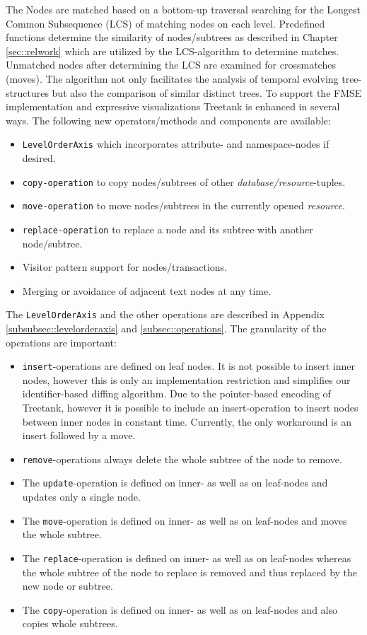 The Nodes are matched based on a bottom-up traversal searching for the Longest Common Subsequence (LCS) of matching nodes on each level. Predefined functions determine the similarity of nodes/subtrees as described in Chapter \ref{sec::relwork} which are utilized by the LCS-algorithm to determine matches. Unmatched nodes after determining the LCS are examined for crossmatches (moves). The algorithm not only facilitates the analysis of temporal evolving tree-structures but also the comparison of similar distinct trees. To support the FMSE implementation and expressive visualizations Treetank is enhanced in several ways. The following new operators/methods and components are available:

\begin{itemize}
\item \texttt{LevelOrderAxis} which incorporates attribute- and namespace-nodes if desired.
\item \texttt{copy-operation} to copy nodes/subtrees of other \emph{database/resource}-tuples.
\item \texttt{move-operation} to move nodes/subtrees in the currently opened \emph{resource}.
\item \texttt{replace-operation} to replace a node and its subtree with another node/subtree.
\item Visitor pattern support for nodes/transactions.
\item Merging or avoidance of adjacent text nodes at any time.
\end{itemize}

The \texttt{LevelOrderAxis} and the other operations are described in Appendix \ref{subsubsec::levelorderaxis} and \ref{subsec::operations}. The granularity of the operations are important:

\begin{itemize}
\item \texttt{insert}-operations are defined on leaf nodes. It is not possible to insert inner nodes, however this is only an implementation restriction and simplifies our identifier-based diffing algorithm. Due to the pointer-based encoding of Treetank, however it is possible to include an insert-operation to insert nodes between inner nodes in constant time. Currently, the only workaround is an insert followed by a move.
\item \texttt{remove}-operations always delete the whole subtree of the node to remove.
\item The \texttt{update}-operation is defined on inner- as well as on leaf-nodes and updates only a single node.
\item The \texttt{move}-operation is defined on inner- as well as on leaf-nodes and moves the whole subtree.
\item The \texttt{replace}-operation is defined on inner- as well as on leaf-nodes whereas the whole subtree of the node to replace is removed and thus replaced by the new node or subtree.
\item The \texttt{copy}-operation is defined on inner- as well as on leaf-nodes and also copies whole subtrees.
\end{itemize}


